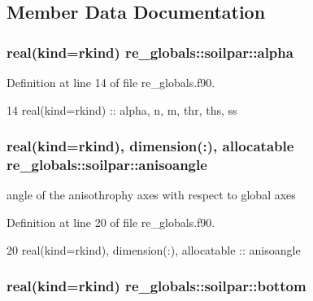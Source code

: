 \subsection{Member Data Documentation}
\subsubsection[{alpha}]{\setlength{\rightskip}{0pt plus 5cm}real(kind=rkind) re\+\_\+globals\+::soilpar\+::alpha}\label{structre__globals_1_1soilpar_abcdc7768c55c99c31a5fc92cb4c2ad1e}


Definition at line 14 of file re\+\_\+globals.\+f90.


\begin{DoxyCode}
14     \textcolor{keywordtype}{real(kind=rkind)} :: alpha, n, m, thr, ths, ss
\end{DoxyCode}
\subsubsection[{anisoangle}]{\setlength{\rightskip}{0pt plus 5cm}real(kind=rkind), dimension(\+:), allocatable re\+\_\+globals\+::soilpar\+::anisoangle}\label{structre__globals_1_1soilpar_adfa02fa2b493df59d20fede5a7ce65d8}


angle of the anisothrophy axes with respect to global axes 



Definition at line 20 of file re\+\_\+globals.\+f90.


\begin{DoxyCode}
20     \textcolor{keywordtype}{real(kind=rkind)}, \textcolor{keywordtype}{dimension(:)}, \textcolor{keywordtype}{allocatable}   :: anisoangle
\end{DoxyCode}
\subsubsection[{bottom}]{\setlength{\rightskip}{0pt plus 5cm}real(kind=rkind) re\+\_\+globals\+::soilpar\+::bottom}\label{structre__globals_1_1soilpar_a4697dd8769b6e68e0b2e32416089b509}


